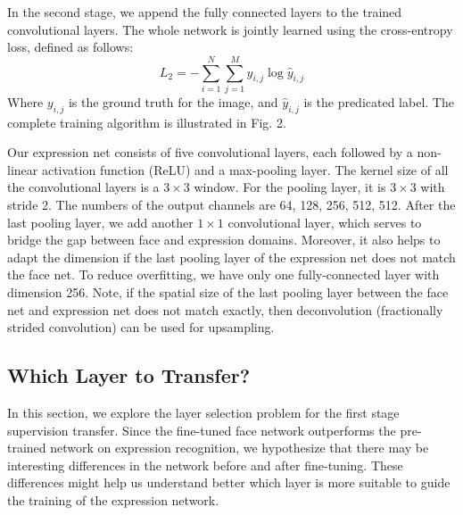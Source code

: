 \documentclass[a4paper, 10pt, conference]{ieeeconf}      %
\begin{document}
In the second stage, we append the fully connected layers to the trained convolutional layers. The whole network is jointly learned using the cross-entropy loss, defined as follows:
\begin{equation}
L_2 = - \sum_{i=1}^N \sum_{j=1}^M y_{i,j} \log \hat{y}_{i,j}
\end{equation}
Where $y_{i,j}$ is the ground truth for the image, and $\hat{y}_{i,j}$ is the predicated label.
 The complete training algorithm is illustrated in Fig. 2.


Our expression net consists of five convolutional layers, each followed by a non-linear activation function (ReLU)  and a max-pooling layer. The kernel size of all the convolutional layers is a $3 \times 3$ window. For the pooling layer, it is $3 \times 3$ with stride 2. The numbers of the output channels are 64, 128, 256, 512, 512. After the last pooling layer, we add another $1 \times 1$ convolutional layer, which serves to bridge the gap between face and expression domains. Moreover, it also helps to adapt the dimension if the last pooling layer of the expression net does not match the face net.
To reduce overfitting, we have only one fully-connected layer with dimension 256. 
Note, if the spatial size of the last pooling layer between the face net and expression net does not match exactly, then deconvolution (fractionally strided convolution) can be used for upsampling.









\subsection{Which Layer to Transfer?}
In this section, we explore the layer selection problem for the first stage supervision transfer. Since the fine-tuned face network outperforms the pre-trained network on expression recognition, we hypothesize that there may be interesting differences in the network before and after fine-tuning. These differences might help us understand better which layer is more suitable to guide the training of the expression network. 
\end{document}
